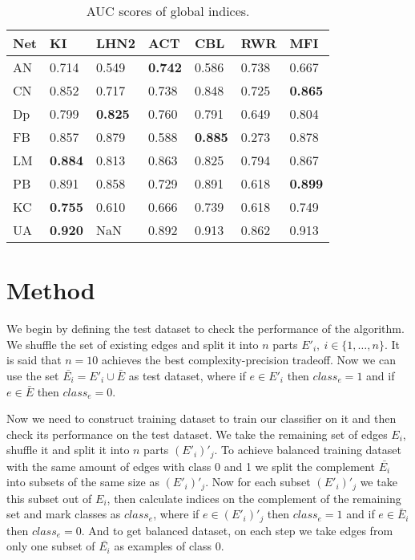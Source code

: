 \documentclass{llncs}
\begin{document}
%
\setlength{\tabcolsep}{5pt}
\renewcommand{\arraystretch}{1.5}
\begin{table}
\begin{center}
\caption{AUC scores of global indices.}
\begin{tabular}{| l | l | l | l | l | l | l |}
\hline
Net & KI & LHN2 & ACT & CBL & RWR & MFI \\ \hline
AN & 0.714 & 0.549 & \textbf{0.742} & 0.586 & 0.738 & 0.667 \\ \hline
CN & 0.852 & 0.717 & 0.738 & 0.848 & 0.725 & \textbf{0.865} \\ \hline
Dp & 0.799 & \textbf{0.825} & 0.760 & 0.791 & 0.649 & 0.804 \\ \hline
FB & 0.857 & 0.879 & 0.588 & \textbf{0.885} & 0.273 & 0.878 \\ \hline
LM & \textbf{0.884} & 0.813 & 0.863 & 0.825 & 0.794 & 0.867 \\ \hline
PB & 0.891 & 0.858 & 0.729 & 0.891 & 0.618 & \textbf{0.899} \\ \hline
KC & \textbf{0.755} & 0.610 & 0.666 & 0.739 & 0.618 & 0.749 \\ \hline
UA & \textbf{0.920} & NaN & 0.892 & 0.913 & 0.862 & 0.913 \\ 
\hline
\end{tabular}
\end{center}
\end{table}
%
\section{Method}
%
We begin by defining the test dataset to check the performance of the algorithm. We shuffle the set of existing edges and split it into $n$ parts $E'_i, \ i \in \{1, \ldots, n\}$. It is said that $n = 10$ achieves the best complexity-precision tradeoff. Now we can use the set $\bar{E_i} = E'_i \cup \bar{E}$ as test dataset, where if $e \in E'_i$ then $class_e = 1$ and if $e \in \bar{E}$ then $class_e = 0$.

Now we need to construct training dataset to train our classifier on it and then check its performance on the test dataset. We take the remaining set of edges $E_i$, shuffle it and split it into $n$ parts $(E'_i)'_j$. To achieve balanced training dataset with the same amount of edges with class 0 and 1 we split the complement $\bar{E_i}$ into subsets of the same size as $(E'_i)'_j$. Now for each subset $(E'_i)'_j$ we take this subset out of $E_i$, then calculate indices on the complement of the remaining set and mark classes as $class_e$, where if $e \in (E'_i)'_j$ then $class_e = 1$ and if $e \in \bar{E}_i$ then $class_e = 0$. And to get balanced dataset, on each step we take edges from only one subset of $\bar{E_i}$ as examples of class 0.
\end{document}
